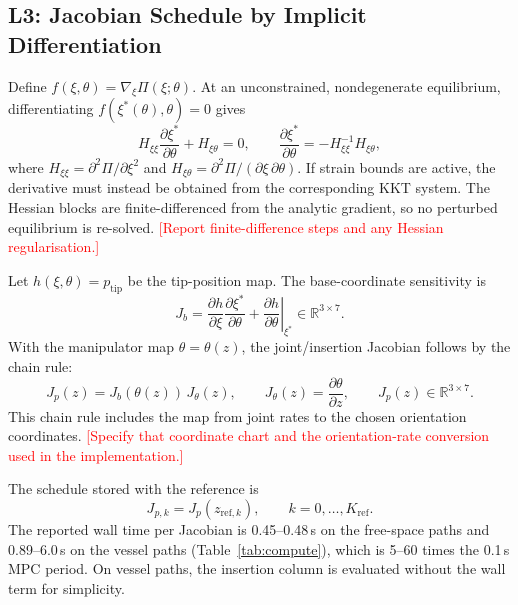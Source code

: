 \documentclass[journal]{IEEEtran}
\newcommand{\TBD}[1]{\textcolor{red}{[#1]}}
\begin{document}
\subsection{L3: Jacobian Schedule by Implicit Differentiation}
\label{sec:l3}

Define $f(\xi,\theta)=\nabla_\xi\Pi(\xi;\theta)$. At an
unconstrained, nondegenerate equilibrium, differentiating
$f(\xi^*(\theta),\theta)=0$ gives
\begin{equation}
H_{\xi\xi}\frac{\partial\xi^*}{\partial\theta}
+H_{\xi\theta}=0,\qquad
\frac{\partial\xi^*}{\partial\theta}
=-H_{\xi\xi}^{-1}H_{\xi\theta},
\label{eq:ift}
\end{equation}
where $H_{\xi\xi}=\partial^2\Pi/\partial\xi^2$ and
$H_{\xi\theta}=\partial^2\Pi/(\partial\xi\,\partial\theta)$.
If strain bounds are active, the derivative must instead be obtained
from the corresponding KKT system. The Hessian blocks are
finite-differenced from the analytic gradient, so no perturbed
equilibrium is re-solved. \TBD{Report finite-difference steps and any
Hessian regularisation.}

Let $h(\xi,\theta)=p_{\mathrm{tip}}$ be the tip-position map. The
base-coordinate sensitivity is
\begin{equation}
J_b=
\frac{\partial h}{\partial\xi}
\frac{\partial\xi^*}{\partial\theta}
+\left.\frac{\partial h}{\partial\theta}\right|_{\xi^*}
\in\mathbb R^{3\times7}.
\label{eq:ift_jac}
\end{equation}
With the manipulator map $\theta=\theta(z)$, the joint/insertion
Jacobian follows by the chain rule:
\begin{equation}
J_p(z)=J_b(\theta(z))\,J_\theta(z),\qquad
J_\theta(z)=\frac{\partial\theta}{\partial z},\qquad
J_p(z)\in\mathbb R^{3\times7}.
\label{eq:joint_jac}
\end{equation}
This chain rule includes the map from joint rates to the chosen
orientation coordinates. \TBD{Specify that coordinate chart and the
orientation-rate conversion used in the implementation.}

The schedule stored with the reference is
\begin{equation}
J_{p,k}=J_p(z_{\mathrm{ref},k}),\qquad k=0,\ldots,K_{\mathrm{ref}}.
\label{eq:schedule}
\end{equation}
The reported wall time per Jacobian is 0.45--0.48\,s on the free-space paths and
0.89--6.0\,s on the vessel paths (Table~\ref{tab:compute}), which is
5--60 times the 0.1\,s MPC period. On vessel paths, the insertion
column is evaluated without the wall term for simplicity.
\end{document}
